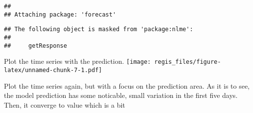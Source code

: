 \documentclass[
]{article}
\newenvironment{Shaded}{\begin{snugshade}}{\end{snugshade}}
\newcommand{\AttributeTok}[1]{\textcolor[rgb]{0.77,0.63,0.00}{#1}}
\newcommand{\DecValTok}[1]{\textcolor[rgb]{0.00,0.00,0.81}{#1}}
\newcommand{\FloatTok}[1]{\textcolor[rgb]{0.00,0.00,0.81}{#1}}
\newcommand{\FunctionTok}[1]{\textcolor[rgb]{0.00,0.00,0.00}{#1}}
\newcommand{\NormalTok}[1]{#1}
\newcommand{\OtherTok}[1]{\textcolor[rgb]{0.56,0.35,0.01}{#1}}
\newcommand{\SpecialCharTok}[1]{\textcolor[rgb]{0.00,0.00,0.00}{#1}}
\newcommand{\StringTok}[1]{\textcolor[rgb]{0.31,0.60,0.02}{#1}}
\begin{document}
\begin{verbatim}
## 
## Attaching package: 'forecast'
\end{verbatim}

\begin{verbatim}
## The following object is masked from 'package:nlme':
## 
##     getResponse
\end{verbatim}

\begin{Shaded}
\end{Shaded}

Plot the time series with the prediction.
\texttt{[image: regis\_files/figure-latex/unnamed-chunk-7-1.pdf]}

Plot the time series again, but with a focus on the prediction area. As
it is to see, the model prediction has some noticable, small variation
in the first five days. Then, it converge to value which is a bit

\begin{Shaded}
\end{Shaded}
\end{document}
